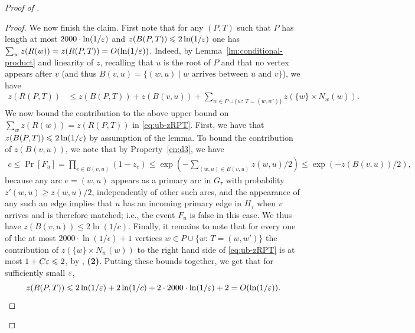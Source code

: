 \begin{proof}[Proof of ]
\begin{proof}
We now finish the claim. First note that for any $(P,T)$ such that $P$ has length at most $2000 \cdot \ln(1/\varepsilon)$ and  $z(B(P,T)) \leqslant 2\ln(1/\varepsilon)$ one has $\sum_w z(R(w)) =  z(R(P,T))=O(\ln(1/\varepsilon))$. Indeed, by Lemma~\ref{lm:conditional-product} and linearity of $z$, recalling that $u$ is the root of $P$ and that no vertex appears after $v$ (and thus $B(v,u)=\{(w,u) \mid w \mbox{ arrives between $u$ and $v$}\}$), we have
\begin{align}\label{eq:ub-zRPT}
z(R(P, T)) & \leq z(B(P,T)) + z(B(v,u)) +  \sum_{w\in P\cup\{w:\, T=(w,w')\}} z\left( \{w\}\times N_w(w)\right).
\end{align}
We now bound the contribution to the above upper bound on $\sum_w z(R(w)) = z(R(P,T))$ in \eqref{eq:ub-zRPT}. First,
we have that $z(B(P, T))\leqslant 2\ln(1/\varepsilon)$ by assumption of the lemma. 
To bound the contribution of  $z(B(v,u))$, we note that by Property~\ref{en:d3}, we have
    \begin{align*}
      c\leq \Pr[F_u] = \prod_{e\in B(v,u)} \left( 1- z_e \right) \leq \exp\left(-\sum_{(w,u)\in B(v,u)} z(w,u)/2\right) \leq \exp(-z(B(v,u))/2),
    \end{align*}
    because any arc $e = (w,u)$ appears as a primary arc in $G_\tau$ with probability $z'(w,u)\geq z(w,u)/2$, independently of other such arcs, and the appearance of any such an edge implies that $u$ has an incoming primary edge in $H_\tau$ when $v$ arrives and is therefore matched; i.e., the event $F_u$ is false in this case. We thus have $z(B(v,u)) \leq 2\ln(1/c)$. Finally, it remains to note that for every one of the at most $2000 \cdot \ln(1/\epsilon)+1$ vertices $w\in P\cup\{w:\, T=(w,w')\}$ the contribution of $z(\{w\}\times N_w(w))$ to 
    the right hand side of \eqref{eq:ub-zRPT} is at most $1+C\varepsilon\leqslant 2$, by , \textbf{(2)}. Putting these bounds together, we get that for sufficiently small $\varepsilon$,
	\begin{equation}\label{eq:923hg92hg}
		z(R(P, T))\leqslant 2\ln(1/\varepsilon)+2\ln(1/c)+2 \cdot 2000 \cdot \ln(1/\varepsilon)+2=O(\ln(1/\varepsilon)).
	\end{equation} 



\end{proof}
\end{proof}
